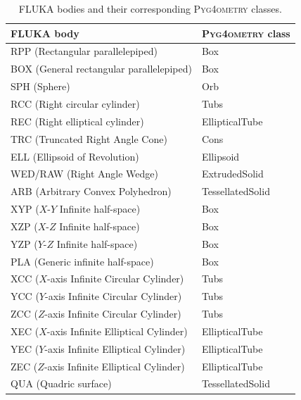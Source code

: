 \documentclass[preprint,12pt]{elsarticle}
\newcommand{\PYGEOMETRY}{\textsc{Pyg4ometry}}
\begin{document}
\begin{table}[hbt!]
\caption{FLUKA bodies and their corresponding \PYGEOMETRY{} classes.} \label{tab:Fluka2Geant4}
\centering
\begin{tabular}{ll} \hline
FLUKA body                                              & \PYGEOMETRY{} class \\ \hline
RPP (Rectangular parallelepiped)			& Box \\
BOX (General rectangular parallelepiped)		& Box \\
SPH (Sphere)    					& Orb \\
RCC (Right circular cylinder)				& Tubs \\
REC (Right elliptical cylinder)				& EllipticalTube \\
TRC (Truncated Right Angle Cone)			& Cons \\
ELL (Ellipsoid of Revolution) 				& Ellipsoid \\
WED/RAW (Right Angle Wedge)		        	& ExtrudedSolid \\
ARB	(Arbitrary Convex Polyhedron)			& TessellatedSolid \\
XYP 	($X$-$Y$ Infinite half-space)			& Box \\
XZP 	($X$-$Z$ Infinite half-space)			& Box \\
YZP 	($Y$-$Z$ Infinite half-space)			& Box \\
PLA (Generic infinite half-space)			& Box \\
XCC ($X$-axis Infinite Circular Cylinder)		& Tubs \\
YCC ($Y$-axis Infinite Circular Cylinder)		& Tubs \\
ZCC 	($Z$-axis Infinite Circular Cylinder)		& Tubs \\
XEC 	($X$-axis Infinite Elliptical Cylinder)		& EllipticalTube \\
YEC 	($Y$-axis Infinite Elliptical Cylinder)		& EllipticalTube \\
ZEC ($Z$-axis Infinite Elliptical Cylinder)		& EllipticalTube \\
QUA (Quadric surface) 					& TessellatedSolid \\ \hline
\end{tabular}
\end{table}
\end{document}
